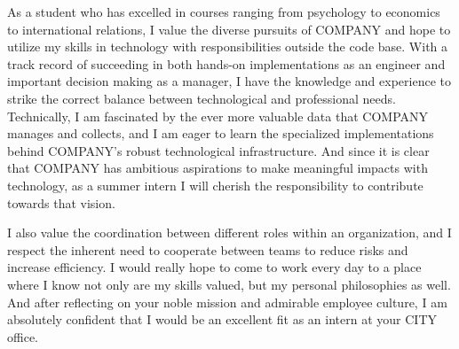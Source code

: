 \documentclass[11pt, a4paper]{awesome-cv}
\begin{document}
\begin{cvletter}

As a student who has excelled in courses ranging from psychology to economics to international relations, I value the diverse pursuits of COMPANY and hope to utilize my skills in technology with responsibilities outside the code base. With a track record of succeeding in both hands-on implementations as an engineer and important decision making as a manager, I have the knowledge and experience to strike the correct balance between technological and professional needs. Technically, I am fascinated by the ever more valuable data that COMPANY manages and collects, and I am eager to learn the specialized implementations behind COMPANY's robust technological infrastructure. And since it is clear that COMPANY has ambitious aspirations to make meaningful impacts with technology, as a summer intern I will cherish the responsibility to contribute towards that vision.

I also value the coordination between different roles within an organization, and I respect the inherent need to cooperate between teams to reduce risks and increase efficiency. I would really hope to come to work every day to a place where I know not only are my skills valued, but my personal philosophies as well. And after reflecting on your noble mission and admirable employee culture, I am absolutely confident that I would be an excellent fit as an intern at your CITY office.

\end{cvletter}

\makeletterclosing
\end{document}
